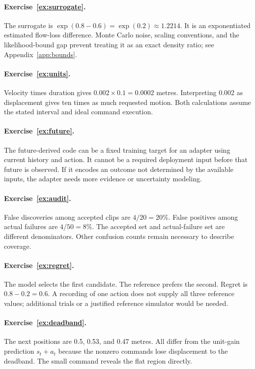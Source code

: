 \paragraph{Exercise~\ref{ex:surrogate}.} The surrogate is $\exp(0.8-0.6)=\exp(0.2)\approx1.2214$. It is an exponentiated estimated flow-loss difference. Monte Carlo noise, scaling conventions, and the likelihood-bound gap prevent treating it as an exact density ratio; see Appendix~\ref{app:bounds}.

\paragraph{Exercise~\ref{ex:units}.} Velocity times duration gives $0.002\times0.1=0.0002$ metres. Interpreting 0.002 as displacement gives ten times as much requested motion. Both calculations assume the stated interval and ideal command execution.

\paragraph{Exercise~\ref{ex:future}.} The future-derived code can be a fixed training target for an adapter using current history and action. It cannot be a required deployment input before that future is observed. If it encodes an outcome not determined by the available inputs, the adapter needs more evidence or uncertainty modeling.

\paragraph{Exercise~\ref{ex:audit}.} False discoveries among accepted clips are $4/20=20\%$. False positives among actual failures are $4/50=8\%$. The accepted set and actual-failure set are different denominators. Other confusion counts remain necessary to describe coverage.

\paragraph{Exercise~\ref{ex:regret}.} The model selects the first candidate. The reference prefers the second. Regret is $0.8-0.2=0.6$. A recording of one action does not supply all three reference values; additional trials or a justified reference simulator would be needed.

\paragraph{Exercise~\ref{ex:deadband}.} The next positions are 0.5, 0.53, and 0.47 metres. All differ from the unit-gain prediction $s_t+a_t$ because the nonzero commands lose displacement to the deadband. The small command reveals the flat region directly.

